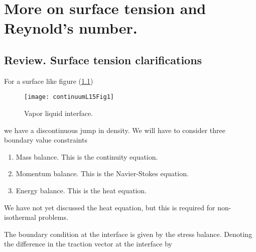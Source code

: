 %
%

\chapter{More on surface tension and Reynold's number.}
\label{chap:continuumL15}
{}
\date{Mar 9, 2012}

\beginArtWithToc

%

\section{Review.  Surface tension clarifications}

For a surface like figure (\ref{fig:continuumL15:continuumL15Fig1})
\begin{figure}[htp]
   \centering
   \texttt{[image: continuumL15Fig1]}
   \caption{Vapor liquid interface.}\label{fig:continuumL15:continuumL15Fig1}
\end{figure}

we have a discontinuous jump in density.  We will have to consider three boundary value constraints

\begin{enumerate}
\item Mass balance.  This is the continuity equation.
\item Momentum balance.  This is the Navier-Stokes equation.
\item Energy balance.  This is the heat equation.
\end{enumerate}

We have not yet discussed the heat equation, but this is required for non-isothermal problems.

The boundary condition at the interface is given by the stress balance.  Denoting the difference in the traction vector at the interface by

